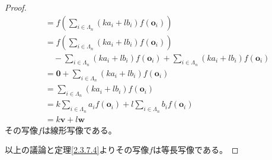 \documentclass[dvipdfmx]{jsarticle}
\begin{document}
\begin{proof}
\begin{align*}
&= f\left( \sum_{i \in \varLambda_{n}} {\left( ka_{i} + lb_{i} \right)f\left( \mathbf{o}_{i} \right)} \right)\\
&= f\left( \sum_{i \in \varLambda_{n}} {\left( ka_{i} + lb_{i} \right)f\left( \mathbf{o}_{i} \right)} \right) \\
&\quad - \sum_{i \in \varLambda_{n}} {\left( ka_{i} + lb_{i} \right)f\left( \mathbf{o}_{i} \right)} + \sum_{i \in \varLambda_{n}} {\left( ka_{i} + lb_{i} \right)f\left( \mathbf{o}_{i} \right)}\\
&= \mathbf{0} + \sum_{i \in \varLambda_{n}} {\left( ka_{i} + lb_{i} \right)f\left( \mathbf{o}_{i} \right)}\\
&= \sum_{i \in \varLambda_{n}} {\left( ka_{i} + lb_{i} \right)f\left( \mathbf{o}_{i} \right)}\\
&= k\sum_{i \in \varLambda_{n}} {a_{i}f\left( \mathbf{o}_{i} \right)} + l\sum_{i \in \varLambda_{n}} {b_{i}f\left( \mathbf{o}_{i} \right)}\\
&= k\mathbf{v} + l\mathbf{w}
\end{align*}
その写像$f$は線形写像である。\par
以上の議論と定理\ref{2.3.7.4}よりその写像$f$は等長写像である。
\end{proof}
\end{document}
